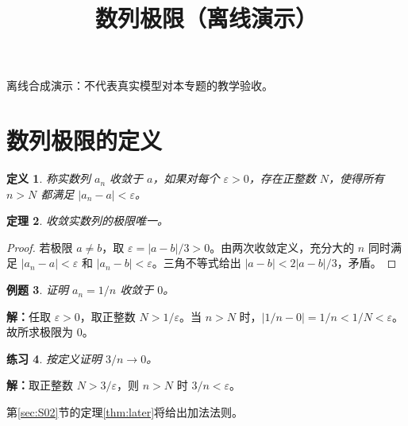 \documentclass[UTF8,fontset=fandol,11pt]{ctexart}
\title{数列极限（离线演示）}
\date{}
\newtheorem{definition}{定义}[section]
\newtheorem{theorem}[definition]{定理}
\newtheorem{example}[definition]{例题}
\newtheorem{exercise}[definition]{练习}
\begin{document}
\maketitle
\par\noindent 离线合成演示：不代表真实模型对本专题的教学验收。\par
\section{数列极限的定义}\label{sec:S01}
\begin{definition}
称实数列 $a_n$ 收敛于 $a$，如果对每个 $\varepsilon>0$，存在正整数 $N$，使得所有 $n>N$ 都满足 $|a_n-a|<\varepsilon$。
\end{definition}
\begin{theorem}
收敛实数列的极限唯一。
\end{theorem}
\begin{proof}
若极限 $a\ne b$，取 $\varepsilon=|a-b|/3>0$。由两次收敛定义，充分大的 $n$ 同时满足 $|a_n-a|<\varepsilon$ 和 $|a_n-b|<\varepsilon$。三角不等式给出 $|a-b|<2|a-b|/3$，矛盾。
\end{proof}
\begin{example}
证明 $a_n=1/n$ 收敛于 $0$。
\end{example}
\par\noindent\textbf{解：}任取 $\varepsilon>0$，取正整数 $N>1/\varepsilon$。当 $n>N$ 时，$|1/n-0|=1/n<1/N<\varepsilon$。故所求极限为 $0$。\par
\begin{exercise}
\label{mathagent:exercise:0cc0e7ee849eb730aacd59475ce492febad40593b04fd779ce32c70f94e1140f}
按定义证明 $3/n\to0$。
\end{exercise}
\par\noindent\textbf{解：}取正整数 $N>3/\varepsilon$，则 $n>N$ 时 $3/n<\varepsilon$。\par
第\ref{sec:S02}节的定理\ref{thm:later}将给出加法法则。\par
\end{document}
